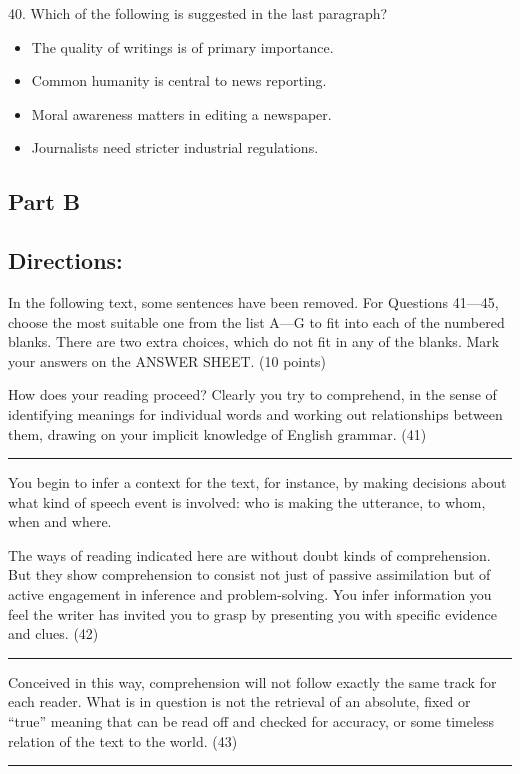 \documentclass[UTF8,11pt]{ctexart}
\begin{document}
40. Which of the following is suggested in the last paragraph?


\begin{itemize}[leftmargin=2em,itemsep=.2em,topsep=.4em]\item[A.] The quality of writings is of primary importance.
\item[B.] Common humanity is central to news reporting.
\item[C.] Moral awareness matters in editing a newspaper.
\item[D.] Journalists need stricter industrial regulations.
\end{itemize}

\subsection*{\textbf{Part B}}


\subsection*{\textbf{Directions:}}


In the following text, some sentences have been removed. For Questions 41—45, choose the most suitable one from the list A—G to fit into each of the numbered blanks. There are two extra choices, which do not fit in any of the blanks. Mark your answers on the ANSWER SHEET. (10 points)


How does your reading proceed? Clearly you try to comprehend, in the sense of identifying meanings for individual words and working out relationships between them, drawing on your implicit knowledge of English grammar. (41)\par\noindent\rule{.95\linewidth}{.4pt}\par  You begin to infer a context for the text, for instance, by making decisions about what kind of speech event is involved: who is making the utterance, to whom, when and where.


The ways of reading indicated here are without doubt kinds of comprehension. But they show comprehension to consist not just of passive assimilation but of active engagement in inference and problem-solving. You infer information you feel the writer has invited you to grasp by presenting you with specific evidence and clues. (42) \par\noindent\rule{.95\linewidth}{.4pt}\par


Conceived in this way, comprehension will not follow exactly the same track for each reader. What is in question is not the retrieval of an absolute, fixed or “true” meaning that can be read off and checked for accuracy, or some timeless relation of the text to the world. (43)\par\noindent\rule{.95\linewidth}{.4pt}\par
\end{document}
